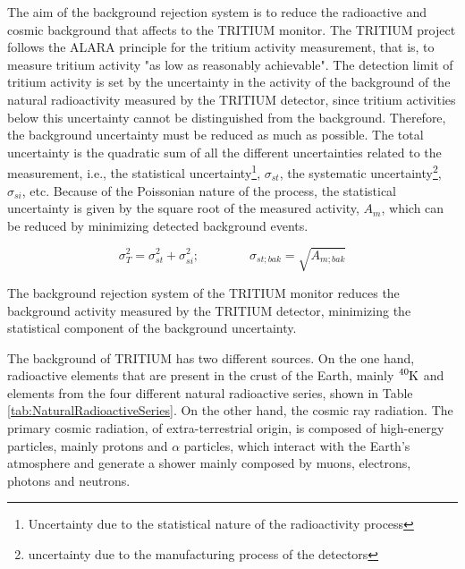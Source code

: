 The aim of the background rejection system is to reduce the radioactive and cosmic background that affects to the TRITIUM monitor. The TRITIUM project follows the ALARA principle for the tritium activity measurement, that is, to measure tritium activity "as low as reasonably achievable". The detection limit of tritium activity is set by the uncertainty in the activity of the background of the natural radioactivity measured by the TRITIUM detector, since tritium activities below this uncertainty cannot be distinguished from the background. Therefore, the background uncertainty must be reduced as much as possible. The total uncertainty is the quadratic sum of all the different uncertainties related to the measurement, i.e., the statistical uncertainty\footnote{Uncertainty due to the statistical nature of the radioactivity process}, $\sigma_{st}$, the systematic uncertainty\footnote{uncertainty due to the manufacturing process of the detectors}, $\sigma_{si}$, etc. Because of the Poissonian nature of the process, the statistical uncertainty is given by the square root of the measured activity, $A_{m}$, which can be reduced by minimizing detected background events.

\begin{equation}
\sigma_{T}^2 = \sigma_{st}^2 +\sigma_{si}^2; \qquad \qquad \sigma_{st;bak} = \sqrt{A_{m;bak}}
\label{eq:SquareSumUncerainty}
\end{equation} 

The background rejection system of the TRITIUM monitor reduces the background activity measured by the TRITIUM detector, minimizing the statistical component of the background uncertainty.

The background of TRITIUM has two different sources. On the one hand, radioactive elements that are present in the crust of the Earth, mainly $\ce{^{40}K}$ and elements from the four different natural radioactive series, shown in Table \ref{tab:NaturalRadioactiveSeries}. On the other hand, the cosmic ray radiation. The primary cosmic radiation, of extra-terrestrial origin, is composed of high-energy particles, mainly protons and $\alpha$ particles, which interact with the Earth's atmosphere and generate a shower mainly composed by muons, electrons, photons and neutrons.

